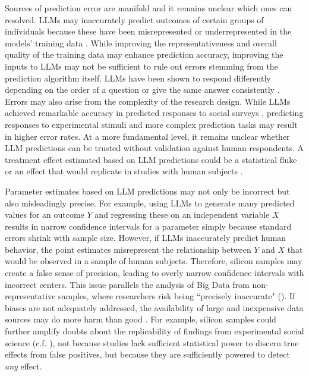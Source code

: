 \documentclass{article}
\begin{document}
Sources of prediction error are manifold and it remains unclear which ones can resolved. LLMs may inaccurately predict outcomes of certain groups of individuals because these have been misrepresented or underrepresented in the models' training data \citep{wang_large_2024,bail_can_2024}. While improving the representativeness and overall quality of the training data may enhance prediction accuracy, improving the inputs to LLMs may not be sufficient to rule out errors stemming from the prediction algorithm itself. LLMs have been shown to respond differently depending on the order of a question or give the same answer consistently \citep{park2024diminished}. Errors may also arise from the complexity of the research design. While LLMs achieved remarkable accuracy in predicted responses to social surveys \citep{kim_ai-augmented_2024}, predicting responses to experimental stimuli and more complex prediction tasks may result in higher error rates. At a more fundamental level, it remains unclear whether LLM predictions can be trusted without validation against human respondents. A treatment effect estimated based on LLM predictions could be a statistical fluke or an effect that would replicate in studies with human subjects  \citep{harding2023ai}.

Parameter estimates based on LLM predictions may not only be incorrect but also misleadingly precise. For example, using LLMs to generate many predicted values for an outcome $Y$ and regressing these on an independent variable $X$ results in narrow confidence intervals for a parameter simply because standard errors shrink with sample size. However, if LLMs inaccurately predict human behavior, the point estimates misrepresent the relationship between $Y$ and $X$ that would be observed in a sample of human subjects. Therefore, silicon samples may create a false sense of precision, leading to overly narrow confidence intervals with incorrect centers. This issue parallels the analysis of Big Data from non-representative samples, where researchers risk being ``precisely inaccurate" (\citealp{mcfarland_big_2015}). If biases are not adequately addressed, the availability of large and inexpensive data sources may do more harm than good \citep{meng_statistical_2018,bradley2021unrepresentative}. For example, silicon samples could further amplify doubts about the replicability of findings from experimental social science (c.f. \citealp{freese_emergence_2018}), not because studies lack sufficient statistical power to discern true effects from false positives, but because they are sufficiently powered to detect \textit{any} effect.
\end{document}
